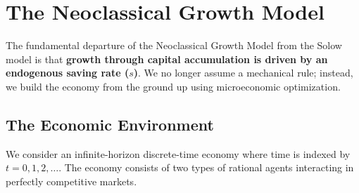 \chapter{The Neoclassical Growth Model}

The fundamental departure of the Neoclassical Growth Model from the Solow model is that \textbf{growth through capital accumulation is driven by an endogenous saving rate ($s$)}. We no longer assume a mechanical rule; instead, we build the economy from the ground up using microeconomic optimization.

\section{The Economic Environment}

We consider an infinite-horizon discrete-time economy where time is indexed by $t = 0, 1, 2, \dots$. The economy consists of two types of rational agents interacting in perfectly competitive markets.
